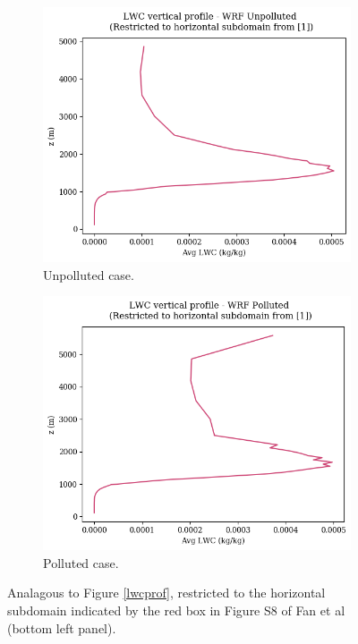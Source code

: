 \documentclass{article}
\begin{document}
\begin{figure}[ht]
	\centering
	\begin{subfigure}{1\textwidth}
		\includegraphics[width=\textwidth]{revmywrf/v1_subdom_lwc_vs_z_Unpolluted_figure.png}
		\caption{Unpolluted case.}
		\label{subdomlwcprofunpoll}
	\end{subfigure}
	\begin{subfigure}{1\textwidth}
		\includegraphics[width=\textwidth]{revmywrf/v1_subdom_lwc_vs_z_Polluted_figure.png}
		\caption{Polluted case.}
		\label{subdomlwcprofpoll}
	\end{subfigure}
	\caption{Analagous to Figure \ref{lwcprof}, restricted to the horizontal subdomain indicated by the red box in Figure S8 of Fan et al (bottom left panel).}
	\label{subdomlwcprof}
\end{figure}
\end{document}
